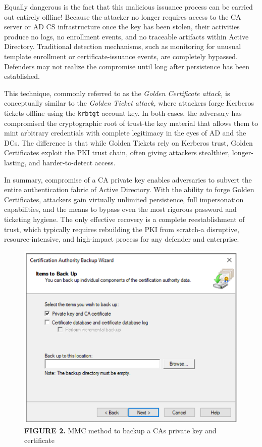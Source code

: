 {Equally dangerous is the fact that this malicious issuance process can be carried out entirely offline! Because the attacker no longer requires access to the CA server or AD CS infrastructure once the key has been stolen, their activities produce no logs, no enrollment events, and no traceable artifacts within Active Directory. Traditional detection mechanisms, such as monitoring for unusual template enrollment or certificate-issuance events, are completely bypassed. Defenders may not realize the compromise until long after persistence has been established.

This technique, commonly referred to as the \textit{Golden Certificate attack,} is conceptually similar to the \textit{Golden Ticket attack,} where attackers forge Kerberos tickets offline using the \texttt{krbtgt} account key. In both cases, the adversary has compromised the cryptographic root of trust-the key material that allows them to mint arbitrary credentials with complete legitimacy in the eyes of AD and the DCs. The difference is that while Golden Tickets rely on Kerberos trust, Golden Certificates exploit the PKI trust chain, often giving attackers stealthier, longer-lasting, and harder-to-detect access.

In summary, compromise of a CA private key enables adversaries to subvert the entire authentication fabric of Active Directory. With the ability to forge Golden Certificates, attackers gain virtually unlimited persistence, full impersonation capabilities, and the means to bypass even the most rigorous password and ticketing hygiene. The only effective recovery is a complete reestablishment of trust, which typically requires rebuilding the PKI from scratch-a disruptive, resource-intensive, and high-impact process for any defender and enterprise.

\begin{figure}
    \centering
    
    \includegraphics[width=0.75\linewidth]{cabackup.png}
    \caption{\textbf{FIGURE 2.} MMC method to backup a CAs private key and certificate}
    \label{fig:placeholder}


\end{figure}}
